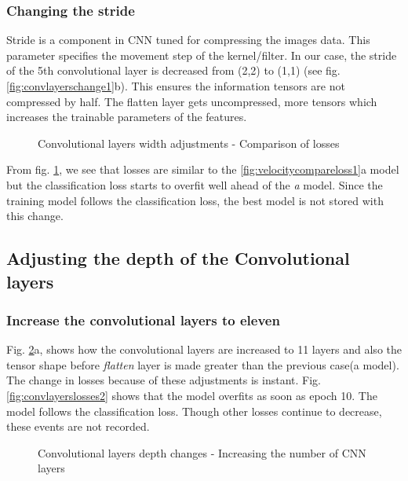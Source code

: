 \subsubsection*{Changing the stride}
Stride is a component in CNN tuned for compressing the images data. This parameter
specifies the movement step of the kernel/filter. In our case, the stride of the 5th
convolutional layer is decreased from (2,2) to (1,1) (see fig.
\ref{fig:convlayerschange1}b). This ensures the information
tensors are not compressed by half. The flatten layer gets uncompressed, more tensors
which increases the trainable parameters of the features.
\begin{figure}[!ht]
    \centering
    \def\svgwidth{\textwidth}
    \caption{Convolutional layers width adjustments - Comparison of losses}
    \label{fig:convlayerslosses1}
\end{figure}
From fig. \ref{fig:convlayerslosses1}, we see that losses are similar to the
\ref{fig:velocitycompareloss1}a model but the classification loss starts to overfit well
ahead of the \textit{a} model. Since the training model follows the classification loss,
the best model is not stored with this change.

\subsection{Adjusting the depth of the Convolutional layers}
\subsubsection*{Increase the convolutional layers to eleven}
Fig. \ref{fig:convlayerschange2}a, shows how the convolutional layers are increased to 11
layers and also the tensor shape before \textit{flatten} layer is made greater than the
previous case(a model). The change in losses because of these adjustments is instant.
Fig. \ref{fig:convlayerslosses2} shows that the model overfits as soon as epoch 10. The
model follows the classification loss. Though other losses continue to decrease, these
events are not recorded.
\begin{figure}[!ht]
    \def\svgwidth{\textwidth}
    \caption{Convolutional layers depth changes - Increasing the number of CNN layers}
    \label{fig:convlayerschange2}
\end{figure}
